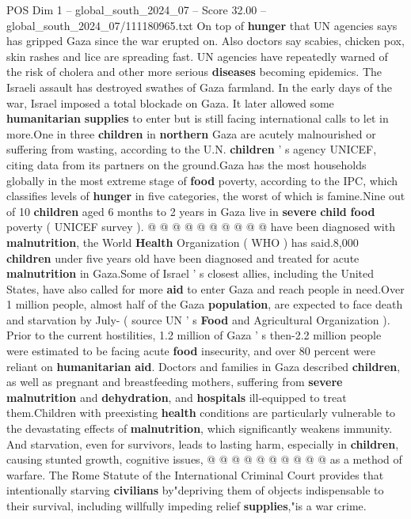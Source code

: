 \begin{textsample}{POS Dim 1 – global\_south\_2024\_07 – Score 32.00 – global\_south\_2024\_07/111180965.txt}
On top of \textbf{hunger} that UN agencies says has gripped Gaza since the war erupted on.
Also doctors say scabies, chicken pox, skin rashes and lice are spreading fast.
UN agencies have repeatedly warned of the risk of cholera and other more serious \textbf{diseases} becoming epidemics.
The Israeli assault has destroyed swathes of Gaza farmland.
In the early days of the war, Israel imposed a total blockade on Gaza.
It later allowed some \textbf{humanitarian} \textbf{supplies} to enter but is still facing international calls to let in more.One in three \textbf{children} in \textbf{northern} Gaza are acutely malnourished or suffering from wasting, according to the U.N. \textbf{children} ' s agency UNICEF, citing data from its partners on the ground.Gaza has the most households globally in the most extreme stage of \textbf{food} poverty, according to the IPC, which classifies levels of \textbf{hunger} in five categories, the worst of which is famine.Nine out of 10 \textbf{children} aged 6 months to 2 years in Gaza live in \textbf{severe} \textbf{child} \textbf{food} poverty ( UNICEF survey ). @ @ @ @ @ @ @ @ @ @ have been diagnosed with \textbf{malnutrition}, the World \textbf{Health} Organization ( WHO ) has said.8,000 \textbf{children} under five years old have been diagnosed and treated for acute \textbf{malnutrition} in Gaza.Some of Israel ' s closest allies, including the United States, have also called for more \textbf{aid} to enter Gaza and reach people in need.Over 1 million people, almost half of the Gaza \textbf{population}, are expected to face death and starvation by July- ( source UN ' s \textbf{Food} and Agricultural Organization ).
Prior to the current hostilities, 1.2 million of Gaza ' s then-2.2 million people were estimated to be facing acute \textbf{food} insecurity, and over 80 percent were reliant on \textbf{humanitarian} \textbf{aid}.
Doctors and families in Gaza described \textbf{children}, as well as pregnant and breastfeeding mothers, suffering from \textbf{severe} \textbf{malnutrition} and \textbf{dehydration}, and \textbf{hospitals} ill-equipped to treat them.Children with preexisting \textbf{health} conditions are particularly vulnerable to the devastating effects of \textbf{malnutrition}, which significantly weakens immunity.
And starvation, even for survivors, leads to lasting harm, especially in \textbf{children}, causing stunted growth, cognitive issues, @ @ @ @ @ @ @ @ @ @ as a method of warfare.
The Rome Statute of the International Criminal Court provides that intentionally starving \textbf{civilians} by"depriving them of objects indispensable to their survival, including willfully impeding relief \textbf{supplies},"is a war crime.

\end{textsample}
